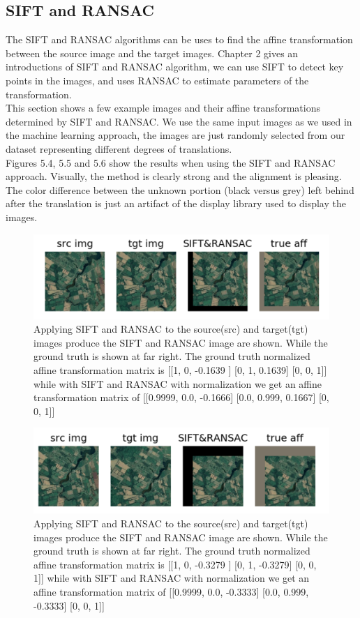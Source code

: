 \subsection{SIFT and RANSAC}
  The SIFT\cite{lowe2004distinctive} and RANSAC\cite{fischler1981random} algorithms can be uses to find the affine transformation between the source image and the target images. Chapter 2 gives an introductions of SIFT and RANSAC algorithm, we can use SIFT to detect key points in the images, and uses RANSAC to estimate parameters of the transformation.\\
  This section shows a few example images and their affine transformations determined by SIFT and RANSAC. We use the same input images as we used in the machine learning approach, the images are just randomly selected from our dataset representing different degrees of translations.\\
   Figures 5.4, 5.5 and 5.6 show the results when using the SIFT and RANSAC approach. Visually, the method is clearly strong and the alignment is pleasing. The color difference between the unknown portion (black versus grey) left behind after the translation is just an artifact of the display library used to display the images.
   
\begin{figure}
\centering
\includegraphics[width = 5.0in]{figs/sift_20r_20up}
\caption{Applying SIFT and RANSAC to the source(src) and target(tgt) images produce the SIFT and RANSAC image are shown. While the ground truth is shown at far right. The ground truth normalized affine transformation matrix is [[1, 0, -0.1639 ] [0, 1, 0.1639] [0, 0, 1]] while with SIFT and RANSAC with normalization we get an affine transformation matrix of [[0.9999, 0.0, -0.1666] [0.0, 0.999, 0.1667] [0, 0, 1]]}
\end{figure}

  
\begin{figure}
\centering
\includegraphics[width = 5.0in]{figs/sift_40down_40right}
\caption{Applying SIFT and RANSAC to the source(src) and target(tgt) images produce the SIFT and RANSAC image are shown. While the ground truth is shown at far right. The ground truth normalized affine transformation matrix is [[1, 0, -0.3279 ] [0, 1, -0.3279] [0, 0, 1]] while with SIFT and RANSAC with normalization we get an affine transformation matrix of [[0.9999, 0.0, -0.3333] [0.0, 0.999, -0.3333] [0, 0, 1]]}
\end{figure}


